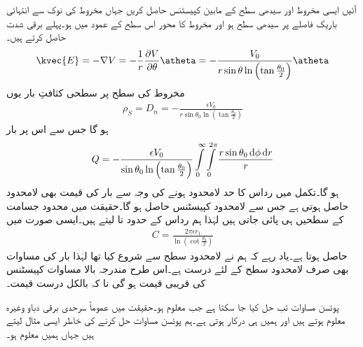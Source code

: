 آئیں ایسی مخروط اور سیدھی سطح کے مابین کپیسٹنس حاصل کریں جہاں مخروط کی نوک سے انتہائی باریک فاصلے پر سیدھی سطح ہو اور مخروط کا محور اس سطح کے عمود میں ہو۔پہلے برقی شدت حاصل کرتے ہیں۔
\begin{align}
\kvec{E}=-\nabla V=-\frac{1}{r} \frac{\partial V}{\partial \theta} \atheta=-\frac{V_0}{r \sin \theta  \ln \left (\tan \frac{\theta_0}{2} \right)} \atheta
\end{align}
مخروط کی سطح پر سطحی کثافتِ بار یوں
\begin{align*}
\rho_S=D_n=-\frac{\epsilon V_0}{r \sin \theta_0  \ln \left (\tan \frac{\theta_0}{2} \right)}
\end{align*}
ہو گا جس سے اس پر بار
\begin{align*}
Q=-\frac{\epsilon V_0}{\sin \theta_0  \ln \left (\tan \frac{\theta_0}{2} \right)}\int \limits_0^\infty \int \limits_0^{2\pi}\frac{r \sin \theta_0 \dif \phi \dif r}{r}
\end{align*}
ہو گا۔تکمل میں رداس کا حد لامحدود ہونے کی وجہ سے بار کی قیمت بھی لامحدود حاصل ہوتی ہے جس سے لامحدود کپیسٹنس حاصل ہو گا۔حقیقت میں محدود جسامت کے سطحیں ہی پائی جاتی ہیں لہٰذا ہم رداس کے حدود  تا  لیتے ہیں۔ایسی صورت میں
\begin{align}\label{مساوات_لاپلاس_مخروطی_کپیسٹنس}
C=\frac{2\pi \epsilon r_1}{\ln \left(\cot \frac{\theta_0}{2} \right)}
\end{align}
حاصل ہوتا ہے۔یاد رہے کہ ہم نے لامحدود سطح سے شروع کیا تھا لہٰذا بار کی مساوات بھی صرف لامحدود سطح کے لئے درست ہے۔اس طرح مندرجہ بالا مساوات کپیسٹنس کی قریبی قیمت ہو گی نا کہ بالکل درست قیمت۔ 

پوئسن مساوات تب حل کیا جا سکتا ہے جب  معلوم ہو۔حقیقت میں عموماً سرحدی برقی دباو وغیرہ معلوم ہوتے ہیں اور ہمیں  ہی درکار ہوتی ہے۔ہم پوئسن مساوات حل کرنے کی خاطر ایسی مثال لیتے ہیں جہاں ہمیں  معلوم ہو۔

